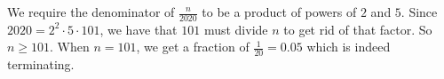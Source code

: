 We require the denominator of $\frac{n}{2020}$ to be a product of powers of $2$ and $5$. Since $2020=2^2\cdot5\cdot101$, we have that $101$ must divide $n$ to get rid of that factor. So $n\geq101$. When $n=101$, we get a fraction of $\frac{1}{20}=0.05$ which is indeed terminating.
